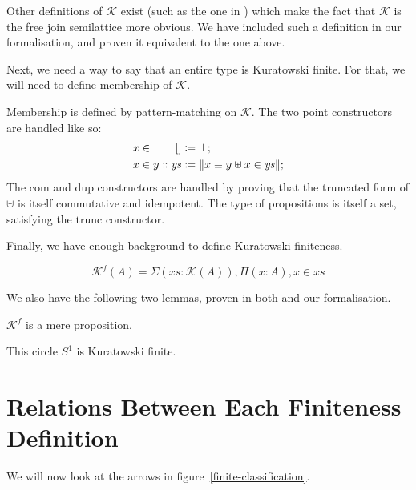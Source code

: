 Other definitions of \(\mathcal{K}\) exist (such as the one in
\cite{fruminFiniteSetsHomotopy2018}) which make the fact that \(\mathcal{K}\) is
the free join semilattice more obvious.
We have included such a definition in our formalisation, and proven it
equivalent to the one above.

Next, we need a way to say that an entire type is Kuratowski finite.
For that, we will need to define membership of \(\mathcal{K}\).
\begin{definition}
  Membership is defined by pattern-matching on \(\mathcal{K}\).
  The two point constructors are handled like so:
  \begin{equation}
    \begin{alignedat}{2}
      x \in&& \; []                      &\coloneqq \bot ; \\
      x \in&& \; y \dblcolon \mathit{ys} &\coloneqq \lVert x \equiv y \uplus x \in \mathit{ys} \rVert ;
    \end{alignedat}
  \end{equation}
  The \(\text{com}\) and \(\text{dup}\) constructors are handled by proving that
  the truncated form of \(\uplus\) is itself commutative and idempotent.
  The type of propositions is itself a set, satisfying the \(\text{trunc}\)
  constructor.
\end{definition}
Finally, we have enough background to define Kuratowski finiteness.
\begin{definition}
  \begin{equation}
    \mathcal{K}^{f}(A) = \Sigma {(\mathit{xs} : \mathcal{K}(A))} , \Pi (x : A) , x \in \mathit{xs}
  \end{equation}
\end{definition}

We also have the following two lemmas, proven in both
\cite{fruminFiniteSetsHomotopy2018} and our formalisation.
\begin{lemma}
  \(\mathcal{K}^f\) is a mere proposition.
\end{lemma}
\begin{lemma}
  This circle \(S^1\) is Kuratowski finite.
\end{lemma}
\section{Relations Between Each Finiteness Definition} \label{relations}
We will now look at the arrows in figure~\ref{finite-classification}.
